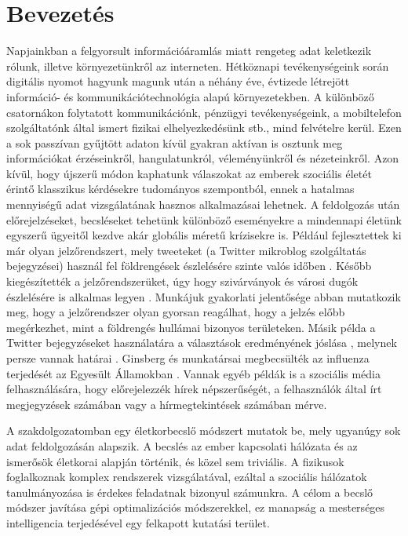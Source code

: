 \documentclass[12pt]{article}
\begin{document}
\section{Bevezetés}
Napjainkban a felgyorsult információáramlás miatt rengeteg adat keletkezik rólunk, illetve környezetünkről az interneten. %
Hétköznapi tevékenységeink során digitális nyomot hagyunk magunk után a néhány éve, évtizede létrejött információ- és kommunikációtechnológia alapú környezetekben.
A különböző csatornákon folytatott kommunikációnk, pénzügyi tevékenységeink, a mobiltelefon szolgáltatónk által ismert fizikai elhelyezkedésünk stb., mind felvételre kerül.
Ezen a sok passzívan gyűjtött adaton kívül gyakran aktívan is osztunk meg információkat érzéseinkről, hangulatunkról, véleményünkről és nézeteinkről.
Azon kívül, hogy újszerű módon kaphatunk válaszokat az emberek szociális életét érintő klasszikus kérdésekre tudományos szempontból, ennek a hatalmas mennyiségű adat vizsgálatának hasznos alkalmazásai lehetnek. A feldolgozás után előrejelzéseket, becsléseket tehetünk különböző eseményekre a mindennapi életünk egyszerű ügyeitől kezdve akár globális méretű krízisekre is.
Például fejlesztettek ki már olyan jelzőrendszert, mely tweeteket (a Twitter mikroblog szolgáltatás bejegyzései) használ fel földrengések észlelésére szinte valós időben \cite{sakaki2010earthquake}.
Később kiegészítették a jelzőrendszerüket, úgy hogy szivárványok és városi dugók észlelésére is alkalmas legyen \cite{sakaki2013tweet}. Munkájuk gyakorlati jelentősége abban mutatkozik meg, hogy a jelzőrendszer olyan gyorsan reagálhat, hogy a jelzés előbb megérkezhet, mint a földrengés hullámai bizonyos területeken.
Másik példa a Twitter bejegyzéseket használatára a választások eredményének jóslása \cite{tumasjan2010predicting}, melynek persze vannak határai \cite{gayo2011limits, gayo2012wanted}.
Ginsberg és munkatársai megbecsülték az influenza terjedését az Egyesült Államokban \cite{ginsberg2009detecting}. Vannak egyéb példák is a szociális média felhasználására, hogy előrejelezzék hírek népszerűségét, a felhasználók által írt megjegyzések számában \cite{tsagkias2009predicting, tsagkias2010news} vagy a hírmegtekintések számában \cite{castillo2014characterizing} mérve.
\cite{bigData_wikipedia}

A szakdolgozatomban egy életkorbecslő módszert mutatok be, mely ugyanúgy sok adat feldolgozásán alapszik. A becslés az ember kapcsolati hálózata és az ismerősök életkorai alapján történik, és közel sem triviális. A fizikusok foglalkoznak komplex rendszerek vizsgálatával, ezáltal a szociális hálózatok tanulmányozása is érdekes feladatnak bizonyul számunkra. A célom a becslő módszer javítása gépi optimalizációs módszerekkel, ez manapság a mesterséges intelligencia terjedésével egy felkapott kutatási terület. %
\end{document}
